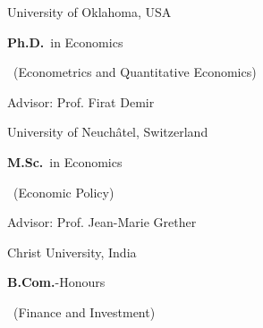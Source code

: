 	{%
		University of Oklahoma, USA}
	{%
		\textbf{Ph.D.}~in Economics \begin{footnotesize}
				~(Econometrics and Quantitative Economics)
			\end{footnotesize}}
	{%
	Advisor: Prof. Firat Demir}

		{%
			University of Neuch\^atel, Switzerland}
		{%
			\textbf{M.Sc.}~in Economics\begin{footnotesize}
				~(Economic Policy)
			\end{footnotesize}}
		{%
	Advisor: Prof. Jean-Marie Grether}

		{%
			Christ University, India}
		{%
			\textbf{B.Com.}-Honours\begin{footnotesize}
				~(Finance and Investment)
			\end{footnotesize}}
		{%
		}